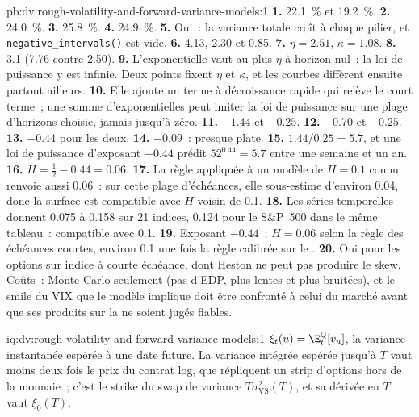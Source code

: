\begin{solution}{pb:dv:rough-volatility-and-forward-variance-models:1}
\textbf{1.} 22.1~\% et 19.2~\%.
\textbf{2.} 24.0~\%.
\textbf{3.} 25.8~\%.
\textbf{4.} 24.9~\%.
\textbf{5.} Oui~: la variance totale croît à chaque pilier, et \texttt{negative\_intervals()} est vide.
\textbf{6.} 4.13, 2.30 et 0.85.
\textbf{7.} $\eta=2.51$, $\kappa=1.08$.
\textbf{8.} 3.1 (7.76 contre 2.50).
\textbf{9.} L'exponentielle vaut au plus $\eta$ à horizon nul~; la loi de puissance y est infinie. Deux points fixent
$\eta$ et $\kappa$, et les courbes diffèrent ensuite partout ailleurs.
\textbf{10.} Elle ajoute un terme à décroissance rapide qui relève le court terme~; une somme d'exponentielles peut imiter la loi de
puissance sur une plage d'horizons choisie, jamais jusqu'à zéro.
\textbf{11.} $-1.44$ et $-0.25$.
\textbf{12.} $-0.70$ et $-0.25$.
\textbf{13.} $-0.44$ pour les deux.
\textbf{14.} $-0.09$~: presque plate.
\textbf{15.} $1.44/0.25=5.7$, et une loi de puissance d'exposant $-0.44$ prédit $52^{0.44}=5.7$ entre une semaine et un
an.
\textbf{16.} $H=\frac12-0.44=0.06$.
\textbf{17.} La règle appliquée à un modèle de $H=0.1$ connu renvoie aussi 0.06~: sur cette plage d'échéances, elle
sous-estime d'environ 0.04, donc la surface est compatible avec $H$ voisin de 0.1.
\textbf{18.} Les séries temporelles donnent 0.075 à 0.158 sur 21 indices, 0.124 pour le S\&P~500 dans le même tableau~: compatible
avec 0.1.
\textbf{19.} Exposant $-0.44$~; $H=0.06$ selon la règle des échéances courtes, environ 0.1 une fois la règle calibrée sur le
.
\textbf{20.} Oui pour les options sur indice à courte échéance, dont Heston ne peut pas produire le skew. Coûts~: Monte-Carlo seulement (pas d'EDP,
 plus lentes et plus bruitées), et le smile du VIX que le modèle implique doit être confronté à celui du marché avant que ses
produits sur la  ne soient jugés fiables.
\end{solution}

\begin{solution}{iq:dv:rough-volatility-and-forward-variance-models:1}
$\xi_t(u)=\E^{\mathbb Q}_t[v_u]$, la variance instantanée espérée à une date future. La variance intégrée espérée
jusqu'à $T$ vaut moins deux fois le prix du contrat log, que répliquent un strip d'options hors de la monnaie~; c'est le
strike du swap de variance $T\sigma^2_{\mathrm{VS}}(T)$, et sa dérivée en $T$ vaut $\xi_0(T)$.
\end{solution}

